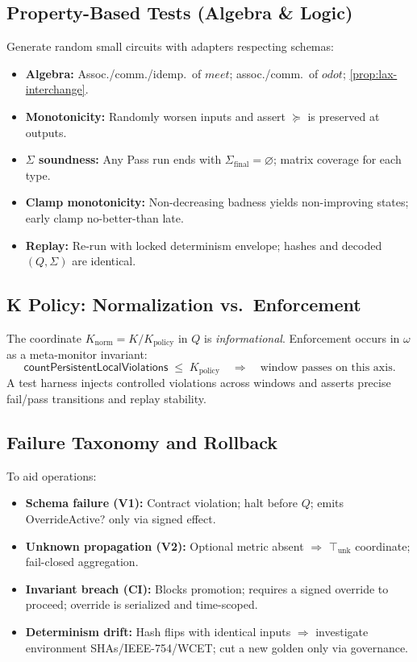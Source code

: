 \documentclass[11pt]{article}
\theoremstyle{plain}
\theoremstyle{definition}
\theoremstyle{remark}
\def\Q{Q}%
\def\Sig{\Sigma}%
\def\vmeet{meet}%
\def\hplus{odot}%
\def\code#1{#1}%
\DeclareRobustCommand{\Q}{\texorpdfstring{\ensuremath{\mathcal{Q}}}{Q}}     %
\DeclareRobustCommand{\Sig}{\texorpdfstring{\ensuremath{\Sigma}}{\Sigma}}   %
\newcommand{\unk}{\top_{\mathrm{unk}}}         %
\newcommand{\vmeet}{\wedge}                    %
\newcommand{\hplus}{\odot}                     %
\newcommand{\geqQ}{\succeq}
\newcommand{\code}[1]{\texttt{\textup{#1}}}    %
\newcommand{\knorm}{\ensuremath{K_{\mathrm{norm}}}}
\newcommand{\om}{\ensuremath{\omega}}
\def\Q{Q}%
\def\Sig{\Sigma}%
\def\vmeet{meet}%
\def\hplus{odot}%
\def\code#1{#1}%
\begin{document}
\subsection{Property-Based Tests (Algebra \& Logic)}
Generate random small circuits with adapters respecting schemas:
\begin{itemize}[leftmargin=1.6em]
  \item \textbf{Algebra:} Assoc./comm./idemp.\ of $\vmeet$; assoc./comm.\ of $\hplus$; \cref{prop:lax-interchange}.
  \item \textbf{Monotonicity:} Randomly worsen inputs and assert $\geqQ$ is preserved at outputs.
  \item \textbf{$\Sig$ soundness:} Any Pass run ends with $\Sigma_{\mathrm{final}}=\varnothing$; matrix coverage for each type.
  \item \textbf{Clamp monotonicity:} Non-decreasing badness yields non-improving states; early clamp no-better-than late.
  \item \textbf{Replay:} Re-run with locked determinism envelope; hashes and decoded $(\Q,\Sig)$ are identical.
\end{itemize}

\subsection{K Policy: Normalization vs.\ Enforcement}
\label{sec:k-policy}
The coordinate $\knorm = K/K_{\mathrm{policy}}$ in $\Q$ is \emph{informational}. Enforcement occurs in $\om$ as a meta-monitor invariant:
\[
  \textsf{countPersistentLocalViolations} \;\le\; K_{\mathrm{policy}}
  \quad\Longrightarrow\quad \text{window passes on this axis}.
\]
A test harness injects controlled violations across windows and asserts precise fail/pass transitions and replay stability.

\subsection{Failure Taxonomy and Rollback}
To aid operations:
\begin{itemize}[leftmargin=1.6em]
  \item \textbf{Schema failure (V1):} Contract violation; halt before $\Q$; emits \code{OverrideActive?} only via signed effect.
  \item \textbf{Unknown propagation (V2):} Optional metric absent $\Rightarrow$ $\unk$ coordinate; fail-closed aggregation.
  \item \textbf{Invariant breach (CI):} Blocks promotion; requires a signed override to proceed; override is serialized and time-scoped.
  \item \textbf{Determinism drift:} Hash flips with identical inputs $\Rightarrow$ investigate environment SHAs/IEEE-754/WCET; cut a new golden only via governance.
\end{itemize}
\end{document}
